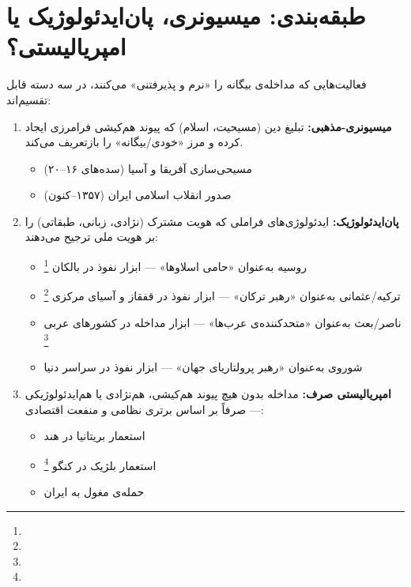 \section{طبقه‌بندی: میسیونری، پان‌ایدئولوژیک یا امپریالیستی؟}
\label{sec:ch09-classification}

\begin{tcolorbox}[defbox, title={سه‌گانه‌ی مفهومی: تسهیل‌گری بیگانه}]
فعالیت‌هایی که مداخله‌ی بیگانه را «نرم و پذیرفتنی» می‌کنند، در سه دسته قابل تقسیم‌اند:

\begin{enumerate}[nosep, label=\textbf{\arabic*.}]
  \item \textbf{میسیونری-مذهبی:} تبلیغ دین (مسیحیت، اسلام) که پیوند هم‌کیشی فرامرزی ایجاد کرده و مرز «خودی/بیگانه» را بازتعریف می‌کند.
  \begin{itemize}[nosep]
    \item مسیحی‌سازی آفریقا و آسیا (سده‌های ۱۶–۲۰)
    \item صدور انقلاب اسلامی ایران (۱۳۵۷–کنون)
  \end{itemize}

  \item \textbf{پان‌ایدئولوژیک:} ایدئولوژی‌های فراملی که هویت مشترک (نژادی، زبانی، طبقاتی) را بر هویت ملی ترجیح می‌دهند:
  \begin{itemize}[nosep]
    \item {} روسیه به‌عنوان «حامی اسلاوها» — ابزار نفوذ در بالکان%
    \footnote{}
    \item {} ترکیه/عثمانی به‌عنوان «رهبر ترکان» — ابزار نفوذ در قفقاز و آسیای مرکزی%
    \footnote{}
    \item {} ناصر/بعث به‌عنوان «متحدکننده‌ی عرب‌ها» — ابزار مداخله در کشورهای عربی%
    \footnote{}
    \item {} شوروی به‌عنوان «رهبر پرولتاریای جهان» — ابزار نفوذ در سراسر دنیا
  \end{itemize}

  \item \textbf{امپریالیستی صرف:} مداخله بدون هیچ پیوند هم‌کیشی، هم‌نژادی یا هم‌ایدئولوژیکی — صرفاً بر اساس برتری نظامی و منفعت اقتصادی:
  \begin{itemize}[nosep]
    \item استعمار بریتانیا در هند
    \item استعمار بلژیک در کنگو%
    \footnote{}
    \item حمله‌ی مغول به ایران
  \end{itemize}
\end{enumerate}
\end{tcolorbox}

